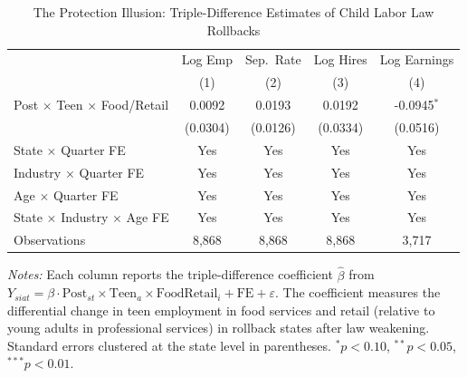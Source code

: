 \begin{table}[htbp]
\centering
\caption{The Protection Illusion: Triple-Difference Estimates of Child Labor Law Rollbacks}
\label{tab:main}
\begin{threeparttable}
\begin{tabular}{lcccc}
\toprule
 & Log Emp & Sep.\ Rate & Log Hires & Log Earnings \\
 & (1) & (2) & (3) & (4) \\
\midrule
Post $\times$ Teen $\times$ Food/Retail & 0.0092 & 0.0193 & 0.0192 & -0.0945$^{*}$ \\
 & (0.0304) & (0.0126) & (0.0334) & (0.0516) \\
\midrule
State $\times$ Quarter FE & Yes & Yes & Yes & Yes \\
Industry $\times$ Quarter FE & Yes & Yes & Yes & Yes \\
Age $\times$ Quarter FE & Yes & Yes & Yes & Yes \\
State $\times$ Industry $\times$ Age FE & Yes & Yes & Yes & Yes \\
Observations & 8,868 & 8,868 & 8,868 & 3,717 \\
\bottomrule
\end{tabular}
\begin{tablenotes}[flushleft]\small
\item \textit{Notes:} Each column reports the triple-difference coefficient $\hat{\beta}$ from $Y_{siat} = \beta \cdot \text{Post}_{st} \times \text{Teen}_a \times \text{FoodRetail}_i + \text{FE} + \varepsilon$. The coefficient measures the differential change in teen employment in food services and retail (relative to young adults in professional services) in rollback states after law weakening. Standard errors clustered at the state level in parentheses. $^{*}p<0.10$, $^{**}p<0.05$, $^{***}p<0.01$.
\end{tablenotes}
\end{threeparttable}
\end{table}

